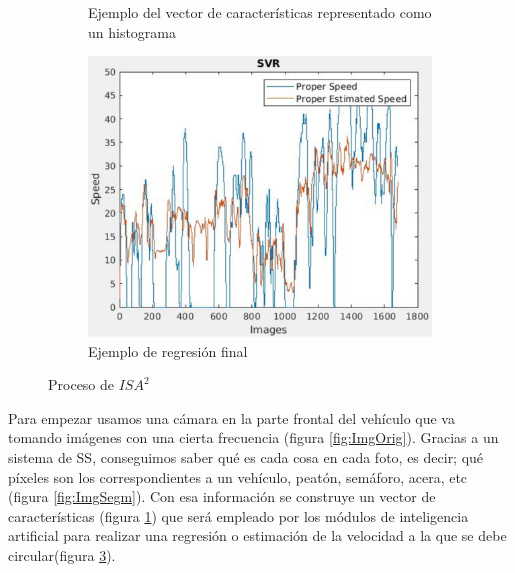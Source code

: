 \begin{figure}[H]
\begin{subfigure}[b]{0.4\linewidth}
    \caption{Ejemplo del vector de características representado como un histograma}
    \label{fig:Hist}
  \end{subfigure}
      \begin{subfigure}[b]{0.4\linewidth}
    \includegraphics[width=\linewidth]{Figuras/SVR_Urban(Nivel_1).eps}
    \caption{Ejemplo de regresión final}
    \label{fig:Regre}
  \end{subfigure}
  \caption{Proceso de $ISA^{2}$}
\end{figure}

Para empezar usamos una cámara en la parte frontal del vehículo que va tomando imágenes con una cierta frecuencia (figura \ref{fig:ImgOrig}). Gracias a un sistema de \ac{SS}, conseguimos saber qué es cada cosa en cada foto, es decir; qué píxeles son los correspondientes a un vehículo, peatón, semáforo, acera, etc (figura \ref{fig:ImgSegm}). Con esa información se construye un vector de características (figura \ref{fig:Hist}) que será empleado por los módulos de inteligencia artificial para realizar una regresión o estimación de la velocidad a la que se debe circular(figura \ref{fig:Regre}).


